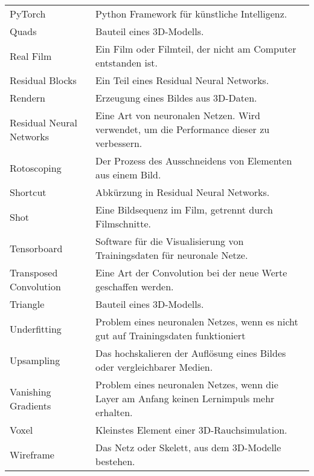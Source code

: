 \begin{table}[ht]
\vspace{-6cm}%
    \begin{tabularx}{\textwidth}{lX}
    PyTorch	&	Python Framework für künstliche Intelligenz.	\\
    Quads & Bauteil eines 3D-Modells.\\
    Real Film & Ein Film oder Filmteil, der nicht am Computer entstanden ist. \\
Residual Blocks	&	Ein Teil eines Residual Neural Networks.	\\
Rendern & Erzeugung eines Bildes aus 3D-Daten.\\
    Residual Neural Networks	&	Eine Art von neuronalen Netzen. Wird verwendet, um die Performance dieser zu verbessern.	\\
Rotoscoping	&	Der Prozess des Ausschneidens von Elementen aus einem Bild.	\\
Shortcut	&	Abkürzung in Residual Neural Networks.	\\
Shot & Eine Bildsequenz im Film, getrennt durch Filmschnitte. \\
    Tensorboard	&	Software für die Visualisierung von Trainingsdaten für neuronale Netze.	\\
Transposed Convolution	&	Eine Art der Convolution bei der neue Werte geschaffen werden.	\\
Triangle & Bauteil eines 3D-Modells.\\
Underfitting	&	Problem eines neuronalen Netzes, wenn es nicht gut auf Trainingsdaten funktioniert	\\
Upsampling	&	Das hochskalieren der Auflösung eines Bildes oder vergleichbarer Medien.	\\
Vanishing Gradients	&	Problem eines neuronalen Netzes, wenn die Layer am Anfang keinen Lernimpuls mehr erhalten.	\\
Voxel & Kleinstes Element einer 3D-Rauchsimulation.\\
Wireframe & Das Netz oder Skelett, aus dem 3D-Modelle bestehen.\\

    \end{tabularx}
    \label{tab:my_label3}
\end{table}



